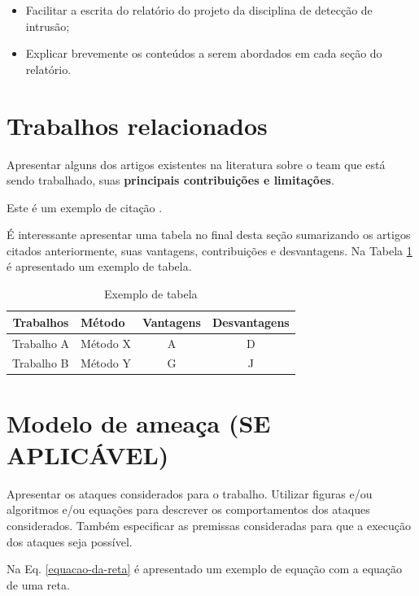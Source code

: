 \documentclass[conference]{IEEEtran}
\begin{document}
\begin{itemize}
    \item Facilitar a escrita do relatório do projeto da disciplina de detecção de intrusão;
    \item Explicar brevemente os conteúdos a serem abordados em cada seção do relatório.
\end{itemize}

\section{Trabalhos relacionados}

Apresentar alguns dos artigos existentes na literatura sobre o team que está sendo trabalhado, suas \textbf{principais contribuições e limitações}.

Este é um exemplo de citação \cite{IEEEhowto:kopka}.

É interessante apresentar uma tabela no final desta seção sumarizando os artigos citados anteriormente, suas vantagens, contribuições e desvantagens. Na Tabela \ref{tab:tabela-exemplo} é apresentado um exemplo de tabela.

\begin{table}[h]
\centering
\caption{Exemplo de tabela}
\label{tab:tabela-exemplo}
\begin{tabular}{llcc}
\hline
\multicolumn{1}{c}{\textbf{Trabalhos}} & \textbf{Método} & \textbf{Vantagens} & \textbf{Desvantagens} \\ \hline
Trabalho A & Método X & A & D \\
Trabalho B & Método Y & G & J
\end{tabular}
\end{table}
\section{Modelo de ameaça (SE APLICÁVEL)}

Apresentar os ataques considerados para o trabalho. Utilizar figuras e/ou algoritmos e/ou equações para descrever os comportamentos dos ataques considerados. Também especificar as premissas consideradas para que a execução dos ataques seja possível.

Na Eq. \eqref{equacao-da-reta} é apresentado um exemplo de equação com a equação de uma reta.
\end{document}
